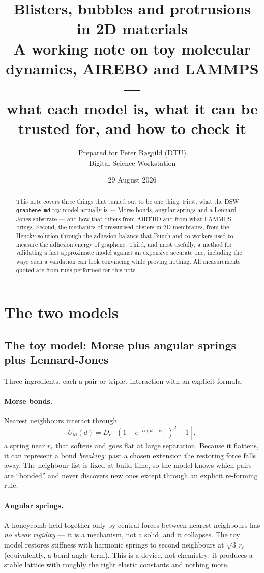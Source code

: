 \documentclass[11pt,a4paper]{article}
\title{\textbf{Blisters, bubbles and protrusions in 2D materials}\\[2mm]
\large A working note on toy molecular dynamics, AIREBO and LAMMPS ---\\
what each model is, what it can be trusted for, and how to check it}
\author{Prepared for Peter Bøggild (DTU) \\ \small Digital Science Workstation}
\date{29 August 2026}
\begin{document}
\maketitle

\begin{abstract}
\noindent
This note covers three things that turned out to be one thing. First, what the
DSW \texttt{graphene-md} toy model actually is --- Morse bonds, angular springs
and a Lennard-Jones substrate --- and how that differs from AIREBO and from what
LAMMPS brings. Second, the mechanics of pressurised blisters in 2D membranes,
from the Hencky solution through the adhesion balance that Bunch and co-workers
used to measure the adhesion energy of graphene. Third, and most usefully, a
method for validating a fast approximate model against an expensive accurate
one, including the ways such a validation can look convincing while proving
nothing. All measurements quoted are from runs performed for this note.
\end{abstract}

\tableofcontents

\section{The two models}

\subsection{The toy model: Morse plus angular springs plus Lennard-Jones}

Three ingredients, each a pair or triplet interaction with an explicit formula.

\paragraph{Morse bonds.} Nearest neighbours interact through
\begin{equation}
U_\mathrm{M}(d) = D_e\left[\left(1-e^{-\alpha(d-r_e)}\right)^2 - 1\right],
\end{equation}
a spring near $r_e$ that softens and goes flat at large separation. Because it
flattens, it can represent a bond \emph{breaking}: past a chosen extension the
restoring force falls away. The neighbour list is fixed at build time, so the
model knows which pairs are ``bonded'' and never discovers new ones except
through an explicit re-forming rule.

\paragraph{Angular springs.} A honeycomb held together only by central forces
between nearest neighbours has \emph{no shear rigidity} --- it is a mechanism,
not a solid, and it collapses. The toy model restores stiffness with harmonic
springs to second neighbours at $\sqrt{3}\,r_e$ (equivalently, a bond-angle
term). This is a device, not chemistry: it produces a stable lattice with
roughly the right elastic constants and nothing more.
\end{document}
